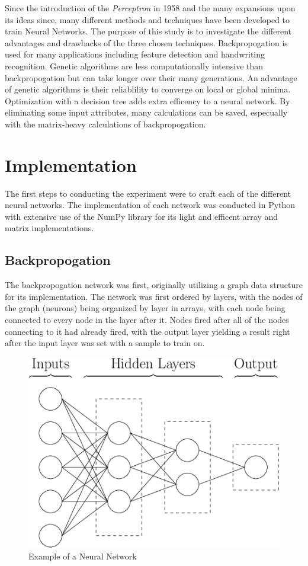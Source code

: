 \documentclass[12pt]{article}
\begin{document}
    Since the introduction of the \textit{Perceptron} in 1958 and the many expansions upon its
    ideas since, many different methods and techniques have been developed to train Neural Networks.  The purpose of
    this study is to investigate the different advantages and drawbacks of the three chosen techniques.  
    Backpropogation is used for many applications
    including feature detection and handwriting recognition.  Genetic algorithms are less computationally intensive than backpropogation
    but can take longer over their many generations.  An advantage of genetic algorithms is their reliablility to converge on local or
    global minima.  Optimization with a decision tree adds extra efficency to a neural network.  By eliminating some input attributes, many calculations
    can be saved, especually with the matrix-heavy calculations of backpropogation.
\section{Implementation}
    The first steps to conducting the experiment were to craft each of the different neural networks.  The implementation
    of each network was conducted in Python \cite{python} with extensive use of the NumPy \cite{numPy} library for its light and efficent
    array and matrix implementations.
    \subsection{Backpropogation} 
        The backpropogation network was first, originally utilizing a graph data structure for its 
        implementation.  The network was first ordered by layers, with the nodes of the graph (neurons) 
        being organized by layer in arrays, with each node being connected to every node in the layer after it.  
        Nodes fired after all of the nodes connecting to it had already fired, with the output layer yielding a result right after the 
        input layer was set with a sample to train on.
        \begin{figure}[h]
            \includegraphics[scale=.3]{nnDiagram.png}
            \centering
            \caption{Example of a Neural Network \cite{nnDiagram}}
        \end{figure}
\end{document}
